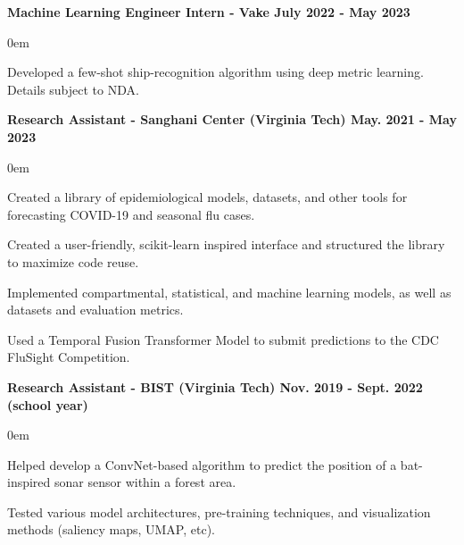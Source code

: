 \documentclass{article}
\begin{document}
\begin{center}
\begin{flushleft}
    \textbf{Machine Learning Engineer Intern - Vake \hfill July 2022 - May 2023}
    \begin{compactitem}
      \itemsep0em
      \item Developed a few-shot ship-recognition algorithm using deep metric learning. Details subject to NDA.
    \end{compactitem}

    \textbf{Research Assistant - Sanghani Center (Virginia Tech) \hfill May. 2021 - May 2023}
    \begin{compactitem}
      \itemsep0em
      \item Created a library of epidemiological models, datasets, and other tools for forecasting COVID-19 and seasonal flu cases. %
      \item Created a user-friendly, scikit-learn inspired interface and structured the library to maximize code reuse.%
      \item Implemented compartmental, statistical, and machine learning models, as well as datasets and evaluation metrics.
      \item Used a Temporal Fusion Transformer Model to submit predictions to the CDC FluSight Competition.
    \end{compactitem}

    \textbf{Research Assistant - BIST (Virginia Tech) \hfill Nov. 2019 - Sept. 2022 (school year)}
    \begin{compactitem}
      \itemsep0em
      \item Helped develop a ConvNet-based algorithm to predict the position of a bat-inspired sonar sensor within a forest area.
      \item Tested various model architectures, pre-training techniques, and visualization methods (saliency maps, UMAP, etc).
    \end{compactitem}


\end{flushleft}
\end{center}
\end{document}
